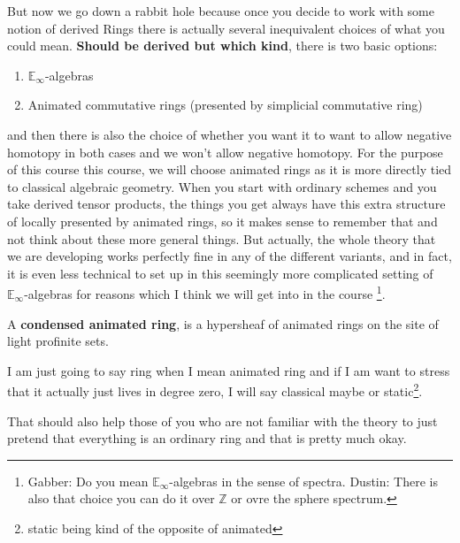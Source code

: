 But now we go down a rabbit hole because once you decide to work with some notion of derived Rings there is actually 
several inequivalent choices of what you could mean. \textbf{Should be derived but which kind}, there is two 
basic options:

\begin{enumerate}
    \item $\mathbb{E}_{\infty}$-algebras 
    \item Animated commutative rings (presented by simplicial commutative ring)
\end{enumerate}


and then there is also the choice of whether you want it to want to allow negative homotopy in both cases and we won't allow negative 
homotopy. For the purpose of this course this course, we will choose animated rings as it is  more directly tied to classical algebraic 
geometry. When you start with ordinary schemes and you take derived tensor products, the things you get always have this extra structure
of locally presented by animated rings, so it makes sense to remember that and not think about these more general things. But actually, the whole theory 
that we are developing works perfectly fine in any of the different variants, and in fact, it is even less technical to set up in 
this seemingly more complicated setting of $\mathbb{E}_{\infty}$-algebras for reasons which I think we will get into in the course
\footnote{Gabber: Do you mean $\mathbb{E}_{\infty}$-algebras in the sense of spectra. Dustin: There is also that choice you can do it over $\mathbb{Z}$ 
 or ovre the sphere spectrum.}.

\begin{definition}
    A \textbf{condensed animated ring}, is a hypersheaf of animated rings on the site of light profinite sets.    
\end{definition}

\begin{convention}
 I am just going to say ring when I mean animated ring and if I am want to stress that it actually just lives in degree zero, 
 I will say classical maybe or static\footnote{static being kind of the opposite of animated}. 
\end{convention}

That should also help those of you who are not familiar with the theory to just pretend that everything is an ordinary ring and 
that is pretty much okay. 
    

